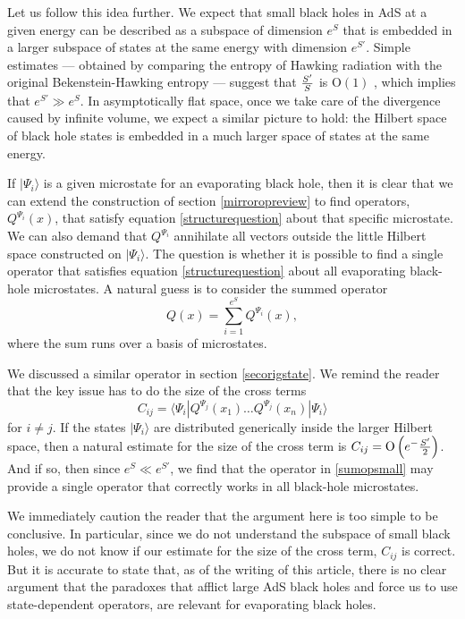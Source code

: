 \documentclass[12pt]{article}
\def\qop{Q}
\def\Or[#1]{{\text{O}}\left({#1}\right)}
\newcommand{\be}{\begin{equation}}
\newcommand{\ee}{\end{equation}}
\begin{document}
Let us follow this idea further. We expect that small black holes in AdS at a given energy can be described as a subspace of dimension $e^{S}$ that is embedded in a larger subspace of states at the same energy with dimension $e^{S'}$. Simple estimates --- obtained by comparing the entropy of Hawking radiation with the original Bekenstein-Hawking entropy --- suggest that ${S' \over S}$ is $\Or[1]$ \cite{Page:2013dx}, which implies that  $e^{S'} \gg e^{S}$. In asymptotically flat space, once we take care of the divergence caused by infinite volume, we expect a similar picture to hold: the Hilbert space of black hole states is embedded in a much larger space of states at the same energy.  

If $|\Psi_i \rangle$ is a given microstate for an evaporating black hole,  then it is clear that we can extend the construction of section \ref{mirroropreview} to find operators, $\qop^{\Psi_i}(x)$,  that satisfy equation \eqref{structurequestion} about  that specific microstate. We can also demand that $\qop^{\Psi_i}$ annihilate all vectors outside the little Hilbert space constructed on $|\Psi_i \rangle$. The question is whether it is possible to find a single operator that satisfies equation \eqref{structurequestion} about all evaporating black-hole microstates. A natural guess is to consider the summed operator 
\be
\label{sumopsmall}
\qop(x) = \sum_{i=1}^{e^{S}} \qop^{\Psi_i}(x),
\ee
where the sum runs over a basis of microstates.

We discussed a similar operator in section  \eqref{secorigstate}. We remind the reader that the key issue  has to do the size of the cross terms
\be
C_{i j} = \langle \Psi_i| \qop^{\Psi_j}(x_1) \ldots \qop^{\Psi_j}(x_n) |\Psi_i\rangle
\ee
for $i \neq j$. If the states $|\Psi_i \rangle$ are distributed generically inside the larger Hilbert space, then a natural estimate for the size of the cross term is $C_{i j} = \Or[e^{-{S' \over 2}}]$. And if so, then since $e^{S} \ll e^{S'}$, we find that the operator in \eqref{sumopsmall} may provide a single operator that correctly works in all black-hole microstates.












We immediately caution the reader that the argument here is too simple to be conclusive. In particular, since we do not understand the subspace of small black holes, we do not know if our estimate for the size of the cross term, $C_{i j}$ is correct. But it is accurate to state that, as of the writing of this article, there is no clear argument that the paradoxes that afflict large AdS black holes and force us to use state-dependent operators, are relevant for evaporating black holes.  
\end{document}
